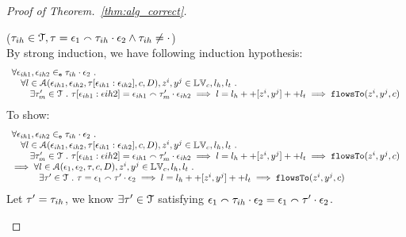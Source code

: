 \begin{proof}[Proof of Theorem.~\ref{thm:alg_correct}]
\begin{case}
\end{case}
%
\begin{case}
($\mathtt{\tau}_{ih} \in \mathcal{T}, \mathtt{\tau} = \mathtt{\epsilon}_1 \smallfrown \mathtt{\tau}_{ih} \cdot \mathtt{\epsilon}_2 \land \mathtt{\tau}_{ih} \neq \cdot$)
\\
By strong induction, we have following induction hypothesis:
%
\[
\begin{array}{l}
  \forall \mathtt{\epsilon}_{ih1}, \mathtt{\epsilon}_{ih2} \in_{\mathtt{e}} \mathtt{\tau}_{ih} \cdot \mathtt{\epsilon}_2 ~.~
  \\ \quad 
   \forall l \in \mathcal{A}(\mathtt{\epsilon}_{ih1}, \mathtt{\epsilon}_{ih2}, \mathtt{\tau}[\mathtt{\epsilon}_{ih1}:\mathtt{\epsilon}_{ih2}], c, D),  z^i, y^j \in \mathbb{LV}_c, l_h, l_t ~.~ 
   \\ \qquad
   \exists \mathtt{\tau}_{m}' \in \mathcal{T} ~.~ 
   \mathtt{\tau}[\mathtt{\epsilon}_{ih1}:\mathtt{\epsilon}{ih2}] = \mathtt{\epsilon}_{ih1} \smallfrown \mathtt{\tau}_{m}' \cdot \mathtt{\epsilon}_{ih2}
   \implies l = l_h ++ [z^i, y^j] ++ l_t 
   \implies \mathtt{flowsTo}(z^i, y^j, c)
\end{array}
\]
%
To show:
\[
\begin{array}{l}
  \forall \mathtt{\epsilon}_{ih1}, \mathtt{\epsilon}_{ih2} \in_{\mathtt{e}} \mathtt{\tau}_{ih} \cdot \mathtt{\epsilon}_2 ~.~
  \\ \quad 
   \forall l \in \mathcal{A}(\mathtt{\epsilon}_{ih1}, \mathtt{\epsilon}_{ih2}, \mathtt{\tau}[\mathtt{\epsilon}_{ih1}:\mathtt{\epsilon}_{ih2}], c, D), z^i, y^j \in \mathbb{LV}_c, l_h, l_t ~.~ 
   \\ \qquad
   \exists \mathtt{\tau}_{m}' \in \mathcal{T} ~.~ 
   \mathtt{\tau}[\mathtt{\epsilon}_{ih1}:\mathtt{\epsilon}{ih2}] = \mathtt{\epsilon}_{ih1} \smallfrown \mathtt{\tau}_{m}' \cdot \mathtt{\epsilon}_{ih2}
   \implies l = l_h ++ [z^i, y^j] ++ l_t 
   \implies \mathtt{flowsTo}(z^i, y^j, c)
   \\
   \implies
   \forall l \in \mathcal{A}(\mathtt{\epsilon}_1, \mathtt{\epsilon}_2, \mathtt{\tau}, c, D),  z^i, y^j \in \mathbb{LV}_c, l_h, l_t ~.~
   \\ \quad \qquad 
   \exists \mathtt{\tau}' \in \mathcal{T} ~.~ \mathtt{\tau} = \mathtt{\epsilon}_1 \smallfrown \mathtt{\tau}' \cdot \mathtt{\epsilon}_2
   \implies l = l_h ++ [z^i, y^j] ++ l_t 
   \implies \mathtt{flowsTo}(z^i, y^j, c)  
\end{array}
\]
%
Let $\mathtt{\tau}' = \mathtt{\tau}_{ih}$, we know $\exists \mathtt{\tau}' \in \mathcal{T}$ satisfying 
$\mathtt{\epsilon}_1  {}\smallfrown \mathtt{\tau}_{ih} \cdot {} \mathtt{\epsilon}_2 = \mathtt{\epsilon}_1 \smallfrown \mathtt{\tau}' \cdot \mathtt{\epsilon}_2$.
\\

\end{case}
\end{proof}
